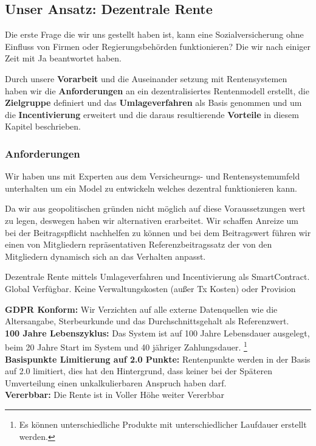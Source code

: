 \subsection{Unser Ansatz: Dezentrale Rente}

Die erste Frage die wir uns gestellt haben ist, kann eine Sozialversicherung ohne Einfluss von Firmen oder Regierungsbehörden funktionieren? Die wir nach einiger Zeit mit Ja beantwortet haben.

Durch unsere \textbf{Vorarbeit} und die Auseinander setzung mit Rentensystemen haben wir die \textbf{Anforderungen} an ein dezentralisiertes Rentenmodell erstellt, die  \textbf{Zielgruppe} definiert und das \textbf{Umlageverfahren} als Basis genommen und um die \textbf{Incentivierung} erweitert und die daraus resultierende \textbf{Vorteile} in diesem Kapitel beschrieben.

\subsubsection*{Anforderungen}
Wir haben uns mit Experten aus dem Versicheurngs- und Rentensystemumfeld unterhalten um ein Model zu entwickeln welches dezentral funktionieren kann.

Da wir aus geopolitischen gründen nicht möglich auf diese Voraussetzungen wert zu legen, deswegen haben wir alternativen erarbeitet.
Wir schaffen Anreize um bei der Beitragspflicht nachhelfen zu können und bei dem Beitragswert führen wir einen von Mitgliedern repräsentativen Referenzbeitragssatz der von den Mitgliedern dynamisch sich an das Verhalten anpasst.

Dezentrale Rente mittels Umlageverfahren und Incentivierung als SmartContract.
Global Verfügbar. Keine Verwaltungskosten (außer Tx Kosten) oder Provision

\textbf{GDPR\cite{gdpr} Konform:} Wir Verzichten auf alle externe Datenquellen wie die Altersangabe, Sterbeurkunde und das Durchschnittsgehalt als Referenzwert.\\
\textbf{100 Jahre Lebenszyklus:} Das System ist auf 100 Jahre Lebensdauer ausgelegt, beim 20 Jahre Start im System und 40 jähriger Zahlungsdauer. \footnote{ Es können unterschiedliche Produkte mit unterschiedlicher Laufdauer erstellt werden.} \\
\textbf{Basispunkte Limitierung auf 2.0 Punkte:} Rentenpunkte werden in der Basis auf 2.0 limitiert, dies hat den Hintergrund, dass keiner bei der Späteren Umverteilung einen unkalkulierbaren Anspruch haben darf.\\
\textbf{Vererbbar:} Die Rente ist in Voller Höhe weiter Vererbbar


